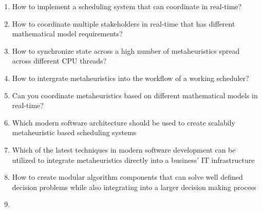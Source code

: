 
  \begin{enumerate}[]
    \item How to implement a scheduling system that can coordinate in real-time?
	\item How to coordinate multiple stakeholders in real-time that has different mathematical model requirements?
	\item How to synchronize state across a high number of metaheuristics spread across different CPU threads?
	\item How to intergrate metaheuristics into the workflow of a working scheduler?
    \item Can you coordinate metaheuristics based on different mathematical models in real-time?
	\item Which modern software architecture should be used to create scalabily metaheuristic based scheduling systems
	\item Which of the latest techniques in modern software development can be utilized to integrate metaheuristics directly into a business' IT infrastructure
	\item How to create modular algorithm components that can solve well defined decision problems while also integrating into a larger decision making process
	\item 
  \end{enumerate}
